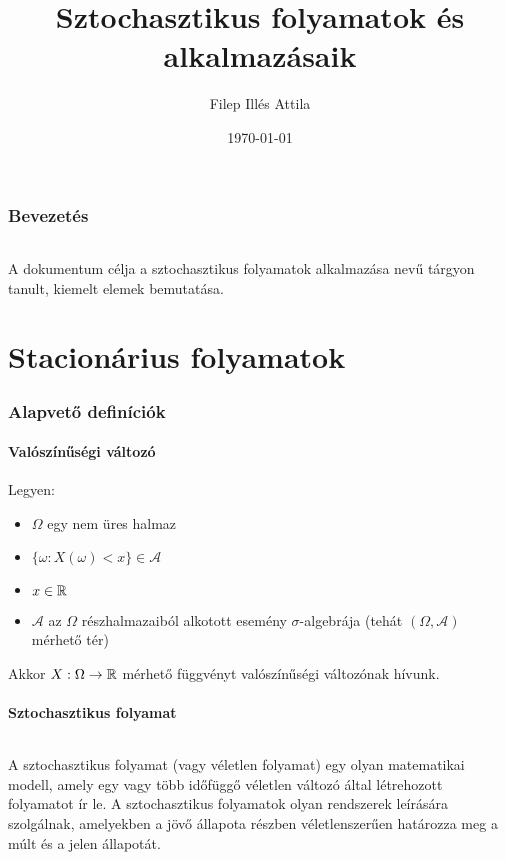 \documentclass[11pt,a4paper]{article}
\title{Sztochasztikus folyamatok és alkalmazásaik}
\date{\today}
\author{Filep Illés Attila}
\begin{document}
 	\maketitle
  	\newpage

	\begin{abstract}

	\end{abstract}
	\tableofcontents
	\section*{Bevezetés}
		\paragraph{}
			A dokumentum célja a sztochasztikus folyamatok alkalmazása nevű tárgyon tanult, kiemelt elemek bemutatása.
	\part{Stacionárius folyamatok}
		\section{Alapvető definíciók}
			\subsection{Valószínűségi változó}
				Legyen:
				\begin{itemize}
					\item $\Omega$ egy nem üres halmaz
					\item $\{\omega : X(\omega) < x\} \in \mathcal{A}$
					\item $x \in \Bbb{R}$
					\item $\mathcal{A}$ az $\Omega$ részhalmazaiból alkotott esemény $\sigma$-algebrája (tehát $(\Omega, \mathcal{A})$ mérhető tér)
				\end{itemize}
				Akkor $X: \Omega \to \Bbb{R}$ mérhető függvényt valószínűségi változónak hívunk.
			\subsection{Sztochasztikus folyamat}
				\paragraph{}
					A sztochasztikus folyamat (vagy véletlen folyamat) egy olyan matematikai modell, amely egy vagy több időfüggő véletlen változó által létrehozott folyamatot ír le. A sztochasztikus folyamatok olyan rendszerek leírására szolgálnak, amelyekben a jövő állapota részben véletlenszerűen határozza meg a múlt és a jelen állapotát.
\end{document}
